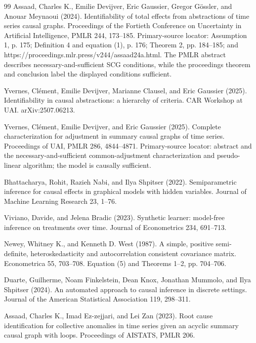 \documentclass{article}
\begin{document}
\begin{thebibliography}{99}
   Assaad, Charles K., Emilie Devijver, Eric Gaussier, Gregor Gössler, and Anouar Meynaoui (2024). Identifiability of total effects from abstractions of time series causal graphs. Proceedings of the Fortieth Conference on Uncertainty in Artificial Intelligence, PMLR 244, 173--185. Primary-source locator: Assumption 1, p. 175; Definition 4 and equation (1), p. 176; Theorem 2, pp. 184--185; and https://proceedings.mlr.press/v244/assaad24a.html. The PMLR abstract describes necessary-and-sufficient SCG conditions, while the proceedings theorem and conclusion label the displayed conditions sufficient.

   Yvernes, Clément, Emilie Devijver, Marianne Clausel, and Eric Gaussier (2025). Identifiability in causal abstractions: a hierarchy of criteria. CAR Workshop at UAI. arXiv:2507.06213.

   Yvernes, Clément, Emilie Devijver, and Eric Gaussier (2025). Complete characterization for adjustment in summary causal graphs of time series. Proceedings of UAI, PMLR 286, 4844--4871. Primary-source locator: abstract and the necessary-and-sufficient common-adjustment characterization and pseudo-linear algorithm; the model is causally sufficient.

   Bhattacharya, Rohit, Razieh Nabi, and Ilya Shpitser (2022). Semiparametric inference for causal effects in graphical models with hidden variables. Journal of Machine Learning Research 23, 1--76.

   Viviano, Davide, and Jelena Bradic (2023). Synthetic learner: model-free inference on treatments over time. Journal of Econometrics 234, 691--713.

   Newey, Whitney K., and Kenneth D. West (1987). A simple, positive semi-definite, heteroskedasticity and autocorrelation consistent covariance matrix. Econometrica 55, 703--708. Equation (5) and Theorems 1--2, pp. 704--706.

   Duarte, Guilherme, Noam Finkelstein, Dean Knox, Jonathan Mummolo, and Ilya Shpitser (2024). An automated approach to causal inference in discrete settings. Journal of the American Statistical Association 119, 298--311.

   Assaad, Charles K., Imad Ez-zejjari, and Lei Zan (2023). Root cause identification for collective anomalies in time series given an acyclic summary causal graph with loops. Proceedings of AISTATS, PMLR 206.

\end{thebibliography}
\end{document}

